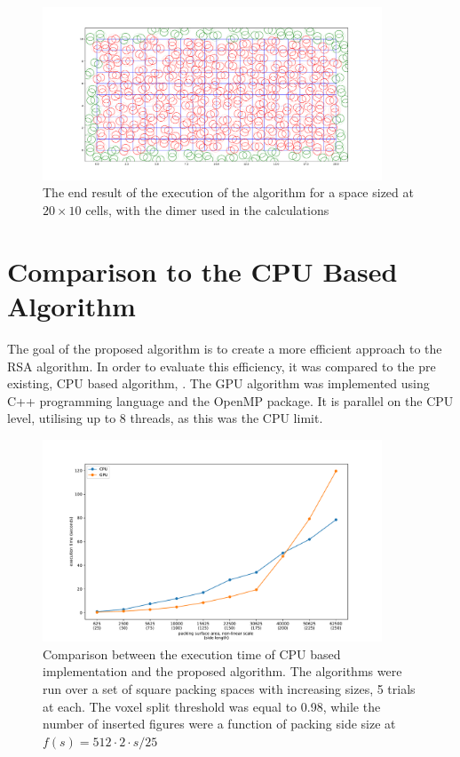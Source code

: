 \documentclass[12pt, oneside]{report}
\begin{document}
\begin{figure}[H]
  \centering
	\includegraphics[width=0.9\textwidth,keepaspectratio]{Images/SummaryOptimisation/dimer_ready.pdf}
	\caption{The end result of the execution of the algorithm for a space sized at $20 \times 10$ cells, with the dimer used in the calculations}
	\label{summary_dimer_ready}
\end{figure}

\section{Comparison to the CPU Based Algorithm}

The goal of the proposed algorithm is to create a more efficient approach to the RSA algorithm. In order to evaluate this efficiency, it was compared to the pre existing, CPU based algorithm, \cite{ciesla}. The GPU algorithm was implemented using C++ programming language and the OpenMP package. It is parallel on the CPU level, utilising up to 8 threads, as this was the CPU limit. \newline


\begin{figure}[H]
  \centering
	\includegraphics[width=0.9\textwidth,keepaspectratio]{Images/SummaryComparison/basic_comparison.pdf}
	\caption{Comparison between the execution time of CPU based implementation and the proposed algorithm. The algorithms were run over a set of square packing spaces with increasing sizes, 5 trials at each. The voxel split threshold was equal to 0.98, while the number of inserted figures were a function of packing side size at $f(s) = 512 \cdot 2 \cdot s/25 $ }
	\label{summary_comparison}
\end{figure}
\end{document}
